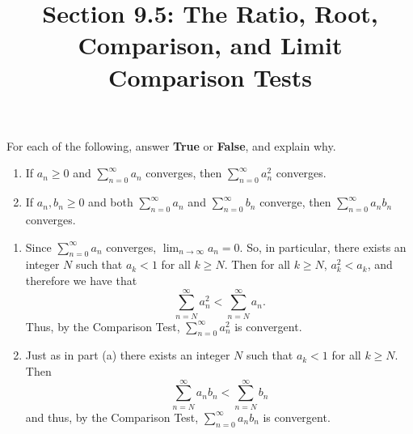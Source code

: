 \documentclass[handout]{ximera}
\title{Section 9.5: The Ratio, Root, Comparison, and Limit Comparison Tests}
\begin{document}
\begin{abstract}		\end{abstract}
\maketitle















For each of the following, answer {\bf True} or {\bf False}, and explain why.
	\begin{enumerate}
	
	\item  If $a_n \geq 0$ and $\sum_{n=0}^\infty a_n$ converges, then $\sum_{n=0}^\infty a_n^2$ converges.
	
	\item  If $a_n, b_n \geq 0$ and both $\sum_{n=0}^\infty a_n$ and $\sum_{n=0}^\infty b_n$ converge, then $\sum_{n=0}^\infty a_n b_n$ converges. 
	
	\end{enumerate}
	
	\begin{freeResponse}
		\begin{enumerate}
		
		\item  {}
		
		Since $\sum_{n=0}^\infty a_n$ converges, $\lim_{n \to \infty} a_n = 0$.  
		So, in particular, there exists an integer $N$ such that $a_k < 1$ for all $k \geq N$.  
		Then for all $k \geq N$, $a_k^2 < a_k$, and therefore we have that
			\[
			\sum_{n=N}^\infty a_n^2 < \sum_{n=N}^\infty a_n.
			\]
		Thus,  by the Comparison Test, $\sum_{n=0}^\infty a_n^2$ is convergent.
		
		
		
		\item  {}
		
		Just as in part (a) there exists an integer $N$ such that $a_k < 1$ for all $k \geq N$.  
		Then
			\[
			\sum_{n=N}^\infty a_n b_n < \sum_{n=N}^\infty b_n
			\]
		and thus, by the Comparison Test, $\sum_{n=0}^\infty a_n b_n$ is convergent.
		
		\end{enumerate}
	\end{freeResponse}
	
\end{document}

